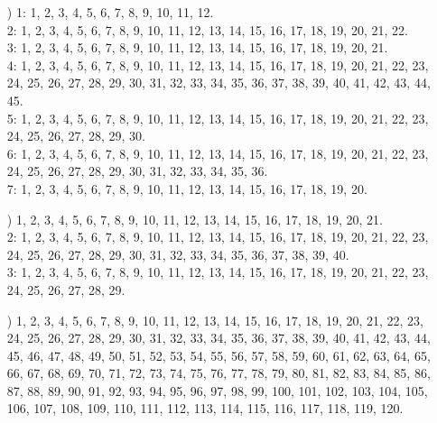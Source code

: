 \documentclass[a4paper,11pt]{article}
\numberwithin{equation}{section}
\begin{document}
\begin{itemize}
\item[\romannumeral4)] 1: 1, 2, 3, 4, 5, 6, 7, 8, 9, 10, 11, 12. \\
  2: 1, 2, 3, 4, 5, 6, 7, 8, 9, 10, 11, 12, 13, 14, 15, 16, 17, 18, 19, 20,
  21, 22. \\
  3: 1, 2, 3, 4, 5, 6, 7, 8, 9, 10, 11, 12, 13, 14, 15, 16, 17, 18, 19, 20,
  21. \\
  4: 1, 2, 3, 4, 5, 6, 7, 8, 9, 10, 11, 12, 13, 14, 15, 16, 17, 18, 19, 20,
  21, 22, 23, 24, 25, 26, 27, 28, 29, 30, 31, 32, 33, 34, 35, 36, 37, 38,
  39, 40, 41, 42, 43, 44, 45. \\
  5: 1, 2, 3, 4, 5, 6, 7, 8, 9, 10, 11, 12, 13, 14, 15, 16, 17, 18, 19, 20,
  21, 22, 23, 24, 25, 26, 27, 28, 29, 30. \\
  6: 1, 2, 3, 4, 5, 6, 7, 8, 9, 10, 11, 12, 13, 14, 15, 16, 17, 18, 19, 20,
  21, 22, 23, 24, 25, 26, 27, 28, 29, 30, 31, 32, 33, 34, 35, 36. \\
  7: 1, 2, 3, 4, 5, 6, 7, 8, 9, 10, 11, 12, 13, 14, 15, 16, 17, 18, 19, 20.



\item[\romannumeral5)] 1, 2, 3, 4, 5, 6, 7, 8, 9, 10, 11, 12, 13, 14, 15,
  16, 17, 18, 19, 20, 21. \\
  2: 1, 2, 3, 4, 5, 6, 7, 8, 9, 10, 11, 12, 13, 14, 15, 16, 17, 18, 19, 20,
  21, 22, 23, 24, 25, 26, 27, 28, 29, 30, 31, 32, 33, 34, 35, 36, 37, 38,
  39, 40. \\
  3: 1, 2, 3, 4, 5, 6, 7, 8, 9, 10, 11, 12, 13, 14, 15, 16, 17, 18, 19, 20,
  21, 22, 23, 24, 25, 26, 27, 28, 29.



\item[\romannumeral6)] 1, 2, 3, 4, 5, 6, 7, 8, 9, 10, 11, 12, 13, 14, 15,
  16, 17, 18, 19, 20, 21, 22, 23, 24, 25, 26, 27, 28, 29, 30, 31, 32, 33,
  34, 35, 36, 37, 38, 39, 40, 41, 42, 43, 44, 45, 46, 47, 48, 49, 50, 51,
  52, 53, 54, 55, 56, 57, 58, 59, 60, 61, 62, 63, 64, 65, 66, 67, 68, 69,
  70, 71, 72, 73, 74, 75, 76, 77, 78, 79, 80, 81, 82, 83, 84, 85, 86, 87,
  88, 89, 90, 91, 92, 93, 94, 95, 96, 97, 98, 99, 100, 101, 102, 103, 104,
  105, 106, 107, 108, 109, 110, 111, 112, 113, 114, 115, 116, 117, 118, 119,
  120.

\end{itemize}
\end{document}
